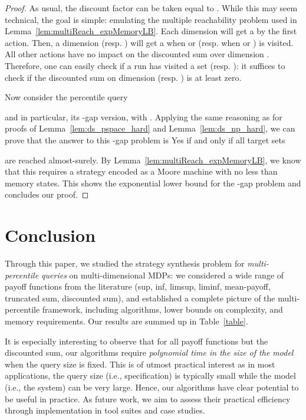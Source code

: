 \documentclass{llncs}
\begin{document}
\begin{proof}
As usual, the discount factor can be taken equal to . While this may seem technical, the goal is simple: emulating the multiple reachability problem used in Lemma~\ref{lem:multiReach_expMemoryLB}. Each dimension  will get a  by the first action. Then, a dimension  (resp. ) will get a  when  or  (resp. when  or ) is visited. All other actions have no impact on the discounted sum over dimension . Therefore, one can easily check if a run  has visited a set  (resp. ): it suffices to check if the discounted sum on dimension  (resp. ) is at least zero.

Now consider the percentile query

and in particular, its -gap version, with . Applying the same reasoning as for proofs of Lemma~\ref{lem:ds_pspace_hard} and Lemma~\ref{lem:ds_np_hard}, we can prove that the answer to this -gap problem is \textsf{Yes} if and only if all target sets
 
are reached almost-surely. By Lemma~\ref{lem:multiReach_expMemoryLB}, we know that this requires a strategy encoded as a Moore machine with no less than  memory states. This shows the exponential lower bound for the -gap problem and concludes our proof.
\end{proof}
 
\section{Conclusion}

Through this paper, we studied the strategy synthesis problem for \textit{multi-percentile queries} on multi-dimen\-sion\-al MDPs: we considered a wide range of payoff functions from the literature (sup, inf, limsup, liminf, mean-payoff, truncated sum, discounted sum), and established a complete picture of the multi-percentile framework, including algorithms, lower bounds on complexity, and memory requirements. Our results are summed up in Table~\ref{table}.

It is especially interesting to observe that for all payoff functions but the discounted sum, our algorithms require \textit{polynomial time in the size of the model} when the query size is fixed. This is of utmost practical interest as in most applications, the query size (i.e., specification) is typically small while the model (i.e., the system) can be very large. Hence, our algorithms have clear potential to be useful in practice. As future work, we aim to assess their practical efficiency through implementation in tool suites and case studies.



\end{document}

